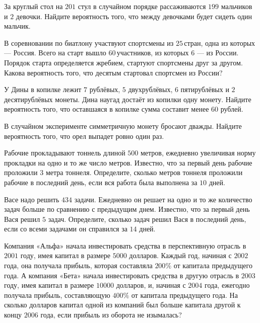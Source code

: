 \begin{class}[number=6]
	\begin{listofex}
		\item За круглый стол на \( 201 \) стул в случайном порядке рассаживаются \( 199 \) мальчиков и \( 2 \) девочки. Найдите вероятность того, что между девочками будет сидеть один мальчик.
		\item В соревновании по биатлону участвуют спортсмены из \( 25 \) стран, одна из которых --- Россия. Всего на старт вышло \( 60 \) участников, из которых \( 6 \) --- из России. Порядок старта определяется жребием, стартуют спортсмены друг за другом. Какова вероятность того, что десятым стартовал спортсмен из России?
		\item У Дины в копилке лежит \( 7 \) рублёвых, \( 5 \) двухрублёвых, \( 6 \) пятирублёвых и \( 2 \) десятирублёвых монеты. Дина наугад достаёт из копилки одну монету. Найдите вероятность того, что оставшаяся в копилке сумма составит менее \( 60 \) рублей.
		\item В случайном эксперименте симметричную монету бросают дважды. Найдите вероятность того, что орел выпадет ровно один раз.
		\item Рабочие прокладывают тоннель длиной \( 500 \) метров, ежедневно увеличивая норму прокладки на одно и то же число метров. Известно, что за первый день рабочие проложили \( 3 \) метра тоннеля. Определите, сколько метров тоннеля проложили рабочие в последний день, если вся работа была выполнена за \( 10 \) дней.
		\item Васе надо решить \( 434 \) задачи. Ежедневно он решает на одно и то же количество задач больше по сравнению с предыдущим днем. Известно, что за первый день Вася решил \( 5 \) задач. Определите, сколько задач решил Вася в последний день, если со всеми задачами он справился за \( 14 \) дней.
		\item Компания «Альфа» начала инвестировать средства в перспективную отрасль в \( 2001 \) году, имея капитал в размере \( 5000 \) долларов. Каждый год, начиная с \( 2002 \) года, она получала прибыль, которая составляла \( 200\% \) от капитала предыдущего года. А компания «Бета» начала инвестировать средства в другую отрасль в \( 2003 \) году, имея капитал в размере \( 10 000 \) долларов, и, начиная с \( 2004 \) года, ежегодно получала прибыль, составляющую \( 400\% \) от капитала предыдущего года. На сколько долларов капитал одной из компаний был больше капитала другой к концу \( 2006 \) года, если прибыль из оборота не изымалась?
	\end{listofex}
\end{class}

